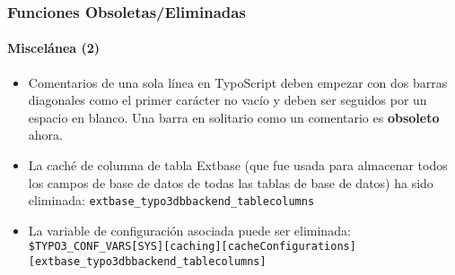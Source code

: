 
\begin{frame}[fragile]
	\frametitle{Funciones Obsoletas/Eliminadas}
	\framesubtitle{Miscelánea (2)}

	\begin{itemize}

		\item Comentarios de una sola línea en TypoScript deben empezar con dos barras diagonales como el primer carácter no vacío
			y deben ser seguidos por un espacio en blanco. Una barra en solitario como un comentario es \textbf{obsoleto} ahora.

		\item La caché de columna de tabla Extbase (que fue usada para almacenar todos los campos de base de datos de todas las tablas de base de datos)
			ha sido eliminada:\newline
			\texttt{extbase\_typo3dbbackend\_tablecolumns}

		\item La variable de configuración asociada puede ser eliminada:
			\smaller
				\texttt{\$TYPO3\_CONF\_VARS[SYS][caching][cacheConfigurations]}\newline
				\tabto{0.4cm}\texttt{[extbase\_typo3dbbackend\_tablecolumns]}
			\normalsize

	\end{itemize}

\end{frame}

